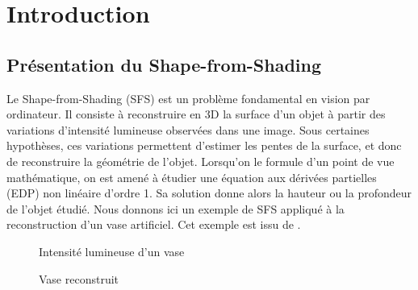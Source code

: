 \section{Introduction}
\subsection{Présentation du Shape-from-Shading}

Le Shape-from-Shading (SFS) est un problème fondamental en vision par ordinateur. Il consiste à reconstruire en 3D la surface d’un objet à partir des variations d’intensité lumineuse observées dans une image. Sous certaines hypothèses, ces variations permettent d’estimer les pentes de la surface, et donc de reconstruire la géométrie de l'objet. Lorsqu'on le formule d'un point de vue mathématique, on est amené à étudier une équation aux dérivées partielles (EDP) non linéaire d'ordre 1. Sa solution donne alors la hauteur ou la profondeur de l'objet étudié. 
Nous donnons ici un exemple de SFS appliqué à la reconstruction d'un vase artificiel. Cet exemple est issu de \cite{ref_vase}.

\begin{figure}[!htb]
    \begin{minipage}[t]{0.5\textwidth}
        \centering
        \caption{Intensité lumineuse d'un vase}\label{Fig:int_vase2}
    \end{minipage}\hfill
    \begin{minipage}[t]{0.5\textwidth}
        \centering
        \caption{Vase reconstruit}\label{Fig:vase_tutor}
    \end{minipage}
\end{figure}

